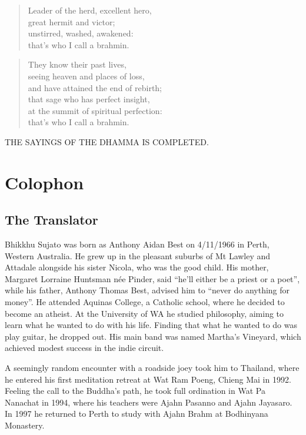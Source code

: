 \documentclass[12pt,openany]{book}%
\newcommand*{\scendbook}[1]{\begin{center}\uppercase{#1}\end{center}}
\let\oldbackmatter\backmatter
\renewcommand{\backmatter}{%
\chapterfont{\setstretch{.85}\normalfont\centering}%
\sectionfont{\setstretch{.85}\Semiboldsubheadfont}%
\oldbackmatter}
\begin{document}
\begin{verse}%
Leader of the herd, excellent hero, \\
great hermit and victor; \\
unstirred, washed, awakened: \\
that’s who I call a brahmin. 

%
\end{verse}

\begin{verse}%
They know their past lives, \\
seeing heaven and places of loss, \\
and have attained the end of rebirth; \\
that sage who has perfect insight, \\
at the summit of spiritual perfection: \\
that’s who I call a brahmin. 

%
\end{verse}

\scendbook{The Sayings of the Dhamma is completed. }

%
\backmatter%
\chapter*{Colophon}

\section*{The Translator}

Bhikkhu Sujato was born as Anthony Aidan Best on 4/11/1966 in Perth, Western Australia. He grew up in the pleasant suburbs of Mt Lawley and Attadale alongside his sister Nicola, who was the good child. His mother, Margaret Lorraine Huntsman née Pinder, said “he’ll either be a priest or a poet”, while his father, Anthony Thomas Best, advised him to “never do anything for money”. He attended Aquinas College, a Catholic school, where he decided to become an atheist. At the University of WA he studied philosophy, aiming to learn what he wanted to do with his life. Finding that what he wanted to do was play guitar, he dropped out. His main band was named Martha’s Vineyard, which achieved modest success in the indie circuit. 

A seemingly random encounter with a roadside joey took him to Thailand, where he entered his first meditation retreat at Wat Ram Poeng, Chieng Mai in 1992. Feeling the call to the Buddha’s path, he took full ordination in Wat Pa Nanachat in 1994, where his teachers were Ajahn Pasanno and Ajahn Jayasaro. In 1997 he returned to Perth to study with Ajahn Brahm at Bodhinyana Monastery. 
\end{document}
